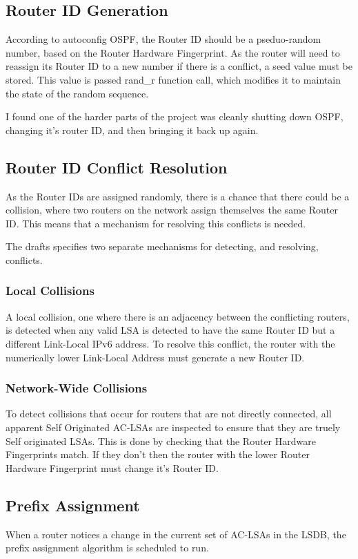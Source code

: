 \documentclass[12pt]{report}
\begin{document}
\subsection{Router ID Generation}
According to autoconfig OSPF, the Router ID should be a pseduo-random number, based 
on the Router Hardware Fingerprint. As the router will need to reassign its Router 
ID to a new number if there is a conflict, a seed value must be stored. This value 
is passed rand_r function call, which modifies it to maintain the state of the 
random sequence.

I found one of the harder parts of the project was cleanly shutting down OSPF, changing it's router ID, and then bringing it back up again. 

\subsection{Router ID Conflict Resolution}
As the Router IDs are assigned randomly, there is a chance that there could be a 
collision, where two routers on the network assign themselves the same Router ID. 
This means that a mechanism for resolving this conflicts is needed. 

The drafts specifies two separate mechanisms for detecting, and resolving, 
conflicts. 

\subsubsection{Local Collisions}
A local collision, one where there is an adjacency between the conflicting routers, 
is detected when any valid LSA is detected to have the same Router ID but a 
different Link-Local IPv6 address. To resolve this conflict, the router with the 
numerically lower Link-Local Address must generate a new Router ID. 

\subsubsection{Network-Wide Collisions}
To detect collisions that occur for routers that are not directly connected, all 
apparent Self Originated AC-LSAs are inspected to ensure that they are truely Self 
originated LSAs. This is done by checking that the Router Hardware Fingerprints 
match. If they don't then the router with the lower Router Hardware Fingerprint must 
change it's Router ID. 

\subsection{Prefix Assignment}
When a router notices a change in the current set of AC-LSAs in the LSDB, the prefix 
assignment algorithm is scheduled to run. 
\end{document}
